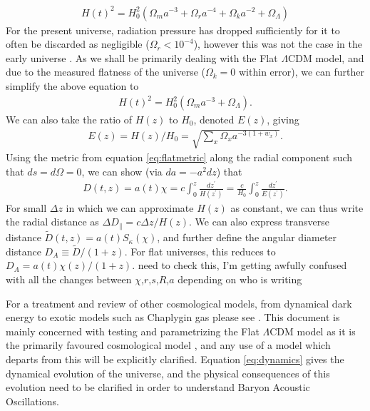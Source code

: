 \documentclass[titlesmallcaps, examinerscopy, copyrightpage]{uqthesis}
\newcommand{\red}{\color{red}}
\begin{document}
\begin{align} \label{eq:dynamics}
H(t)^2 = H_0^2 \left( \Omega_m a^{-3} + \Omega_r a^{-4} + \Omega_k a^{-2} + \Omega_\Lambda \right)
\end{align}
For the present universe, radiation pressure has dropped sufficiently for it to often be discarded as negligible ($\Omega_r < 10^{-4}$), however this was not the case in the early universe \citep{Planck201416, RydenPartridge2004}. As we shall be primarily dealing with the Flat $\Lambda$CDM model, and due to the measured flatness of the universe ($\Omega_k = 0$ within error), we can further simplify the above equation to
\begin{align}
H(t)^2 = H_0^2 \left( \Omega_m a^{-3} + \Omega_\Lambda \right).
\end{align}
We can also take the ratio of $H(z)$ to $H_0$, denoted $E(z)$, giving
\begin{align}
E(z) = H(z) / H_0 = \sqrt{\sum_x \Omega_x a^{-3(1+w_x)}}.
\end{align}
Using the metric from equation \eqref{eq:flatmetric} along the radial component such that $ds = d\Omega = 0$, we can show (via $da = -a^2 dz$) that 
\begin{align}
D(t,z) = a(t) \chi = c \int_0^z \frac{d z^\prime}{H(z^\prime)} = \frac{c}{H_0} \int_0^z \frac{dz^\prime}{E(z^\prime)}.
\end{align}
For small $\Delta z$ in which we can approximate $H(z)$ as constant, we can thus write the radial distance as $\Delta D_\parallel = c\Delta z/H(z)$. We can also express transverse distance $\tilde{D}(t,z) = a(t) S_\kappa(\chi)$, and further define the angular diameter distance $D_A \equiv \tilde{D} / (1 + z)$. For flat universes, this reduces to $D_A = a(t) \chi(z) / (1 + z)$. {\red need to check this, I'm getting awfully confused with all the changes between $\chi$,$r$,$s$,$R$,$a$ depending on who is writing}

For a treatment and review of other cosmological models, from dynamical dark energy \citep{PeeblesRatra1988} to exotic models such as Chaplygin gas \citep{BentoBertolami2003, Benaoum2012} please see \citet{PeeblesRatra2003, FriemanTurnerHuterer2008, GottSlepian2011, DavisMortsell2007}. This document is mainly concerned with testing and parametrizing the Flat $\Lambda$CDM model as it is the primarily favoured cosmological model \citep{Planck201416, SanchezKazinBeutler2013}, and any use of a model which departs from this will be explicitly clarified. Equation \eqref{eq:dynamics} gives the dynamical evolution of the universe, and the physical consequences of this evolution need to be clarified in order to understand Baryon Acoustic Oscillations. \\
\end{document}
